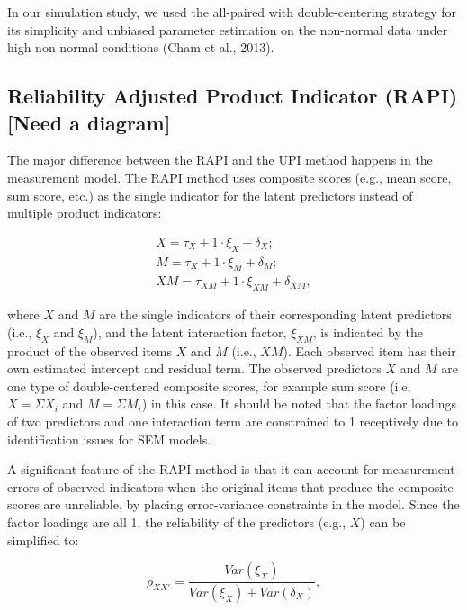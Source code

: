 \documentclass[
  man]{apa7}
\begin{document}
In our simulation study, we used the all-paired with double-centering strategy for its simplicity and unbiased parameter estimation on the non-normal data under high non-normal conditions (Cham et al., 2013).

\hypertarget{reliability-adjusted-product-indicator-rapi-need-a-diagram}{%
\subsection{Reliability Adjusted Product Indicator (RAPI) {[}Need a diagram{]}}\label{reliability-adjusted-product-indicator-rapi-need-a-diagram}}

The major difference between the RAPI and the UPI method happens in the measurement model. The RAPI method uses composite scores (e.g., mean score, sum score, etc.) as the single indicator for the latent predictors instead of multiple product indicators:

\begin{equation}
\begin{gathered}
  X = \tau_{X} + 1\cdot\xi_{X} + \delta_{X};\\
  M = \tau_{X} + 1\cdot\xi_{M} + \delta_{M};\\
  XM = \tau_{XM} + 1\cdot\xi_{XM} + \delta_{XM},
\end{gathered}
\end{equation}

where \(X\) and \(M\) are the single indicators of their corresponding latent predictors (i.e., \(\xi_{X}\) and \(\xi_{M}\)), and the latent interaction factor, \(\xi_{XM}\), is indicated by the product of the observed items \(X\) and \(M\) (i.e., \(XM\)). Each observed item has their own estimated intercept and residual term. The observed predictors \(X\) and \(M\) are one type of double-centered composite scores, for example sum score (i.e, \(X = \Sigma{X_{i}}\) and \(M = \Sigma{M_{i}}\)) in this case. It should be noted that the factor loadings of two predictors and one interaction term are constrained to 1 receptively due to identification issues for SEM models.

A significant feature of the RAPI method is that it can account for measurement errors of observed indicators when the original items that produce the composite scores are unreliable, by placing error-variance constraints in the model. Since the factor loadings are all 1, the reliability of the predictors (e.g., \(X\)) can be simplified to:

\begin{equation}
\rho_{XX'} = \frac{Var(\xi_{X})}{Var(\xi_{X}) + Var(\delta_{X})},
\end{equation}
\end{document}
